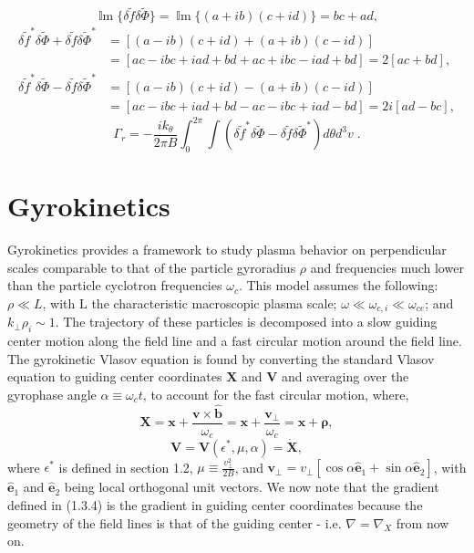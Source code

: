 \documentclass[12pt]{article}
\numberwithin{equation}{subsection}
\begin{document}
   \begin{equation}
      \operatorname{\mathbb{I}m}\{\delta\widetilde{f}\delta\widetilde{\Phi}\} = \operatorname{\mathbb{I}m}\{(a+ib)(c+id)\}
         = bc + ad,
   \end{equation}
   \begin{equation}
   \begin{aligned}
      \delta\widetilde{f}^*\delta\widetilde{\Phi} + \delta\widetilde{f}\delta\widetilde{\Phi}^*
         &= [(a-ib)(c+id) + (a+ib)(c-id)]             \\
         &= [ac-ibc+iad+bd+ac+ibc-iad+bd] = 2[ac+bd], \\
      \delta\widetilde{f}^*\delta\widetilde{\Phi} - \delta\widetilde{f}\delta\widetilde{\Phi}^*
         &= [(a-ib)(c+id) - (a+ib)(c-id)]             \\
         &= [ac-ibc+iad+bd-ac-ibc+iad-bd] = 2i[ad-bc],
   \end{aligned}
   \end{equation}
   \begin{equation}
      \Gamma_r = -\frac{ik_\theta}{2\pi B}\int_{0}^{2\pi}\int(\delta\widetilde{f}^*\delta\widetilde{\Phi}
                 - \delta\widetilde{f}\delta\widetilde{\Phi}^*)d\theta d^{3}v\;.
   \end{equation}


\section{Gyrokinetics}
   \quad Gyrokinetics provides a framework to study plasma behavior on perpendicular scales comparable to that of the
particle gyroradius $\rho$ and frequencies much lower than the particle cyclotron frequencies $\omega_c$. This model assumes
the following: $\rho \ll L$, with L the characteristic macroscopic plasma scale; $\omega \ll \omega_{c,i} \ll \omega_{ce}$;
and $k_\perp \rho_i \sim 1$\cite{GyroKinAstr}. The trajectory of these particles is decomposed into a slow guiding center motion
along the field line and a fast circular motion around the field line. The gyrokinetic Vlasov equation is found by converting the
standard Vlasov equation to guiding center coordinates $\bm{X}$ and $\bm{V}$ and averaging over the gyrophase angle $\alpha
\equiv \omega_c t$, to account for the fast circular motion, where\cite{FriemanChen},
   \begin{equation}
      \bm{X} = \bm{x} + \frac{\bm{v}\times\bm{\hat{b}}}{\omega_c} = \bm{x} + \frac{\bm{v}_\perp}{\omega_c}
             = \bm{x} + \bm{\rho},
   \end{equation}
   \begin{equation}
      \bm{V} = \bm{V}(\epsilon^*, \mu, \alpha) = \dot{\bm{X}},
   \end{equation}
where $\epsilon^*$ is defined in section 1.2, $\mu \equiv \frac{v_\perp^2}{2B}$, and $\bm{v}_\perp =
v_\perp[\cos\alpha\bm{\hat{e}}_1 + \sin\alpha\bm{\hat{e}}_2]$\cite{FriemanChen}, with $\bm{\hat{e}}_1$
and $\bm{\hat{e}}_2$ being local orthogonal unit vectors. We now note that the gradient defined
in (1.3.4) is the gradient in guiding center coordinates because the geometry of the field lines
is that of the guiding center - i.e. $\nabla = \nabla_X$ from now on.
\end{document}
